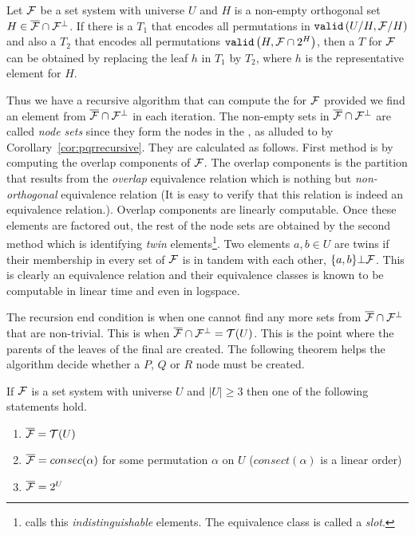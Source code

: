 \begin{corollary}[{\cite[Cor.~8]{mm96}}]
  \label{cor:pqrrecursive}
  Let ${\cal F}$ be a set system with universe $U$ and $H$ is a non-empty
  orthogonal set $H \in \overline{{\cal F}} \cap {\cal F}^{\bot}$. If there is a \PQRtree $T_1$ that
  encodes all permutations in ${\tt valid}\left(U/H, {\cal F}/H\right)$ and also a \PQRtree
  $T_2$ that encodes all permutations ${\tt valid}\left(H,{\cal F} \cap 2^{H}\right)$,
  then a \PQRtree $T$ for ${\cal F}$ can be obtained by replacing the leaf
  $h$ in $T_1$ by $T_2$, where $h$ is the representative element for $H$.
\end{corollary}


Thus we have a recursive algorithm that can compute the \PQRtree for
${\cal F}$ provided we find an element from $\overline{{\cal F}} \cap {\cal F}^{\bot}$ in each iteration. The
non-empty sets in $\overline{{\cal F}} \cap {\cal F}^{\bot}$ are called {\em node sets} since they form the
nodes in the \PQRtree, as alluded to by
Corollary~\ref{cor:pqrrecursive}. They are calculated as follows.
First method is by computing the overlap components of ${\cal F}$. The
overlap components is the partition that results from the {\em
  overlap} equivalence relation which is nothing but {\em
  non-orthogonal} equivalence relation (It is easy to verify
  that this relation is indeed an equivalence relation.). Overlap
components are linearly computable\cite{mm95,wlh92}. Once these
elements are factored out, the rest of the node sets are obtained by
the second method which is identifying {\em twin}
elements\footnote{\cite[Sec.~3]{kklv10} calls this {\em indistinguishable}
  elements. The equivalence class is called a {\em slot}.}. Two
elements $a, b \in U$ are twins if their membership in every set of
${\cal F}$ is in tandem with each other, \ie $\{a,b\} \bot {\cal F}$. This is
clearly an equivalence relation and their equivalence classes is known
to be computable in linear time\cite{wlh01} and even in
logspace\cite{kklv10}.

The recursion end condition is when one cannot find any more sets from
$\overline{{\cal F}} \cap {\cal F}^{\bot}$ that are non-trivial. This is when $\overline{{\cal F}} \cap {\cal F}^{\bot} = {\cal T}(U)$. This is the
point where the parents of the leaves of the final \PQRtree are created. The
following theorem helps the algorithm decide whether a $P$, $Q$ or
$R$ node must be created.

\begin{theoremsansproof}[{\cite[Th.~9]{mm96}}] %
\label{th:pqrfinalmm}
If ${\cal F}$ is a set system with universe $U$ and $|U| \ge 3$ then one of
the following statements hold.
\begin{enumerate}
\item \label{th::it1} $\overline{{\cal F}} = {\cal T}(U)$ 
\item \label{th::it2}$\overline{{\cal F}} = consec(\alpha)$ for
  some permutation $\alpha$ on $U$ ($consect(\alpha)$ is a linear order)
\item \label{th::it3}$\overline{{\cal F}} = 2^{U}$ 
\end{enumerate}
\end{theoremsansproof}

